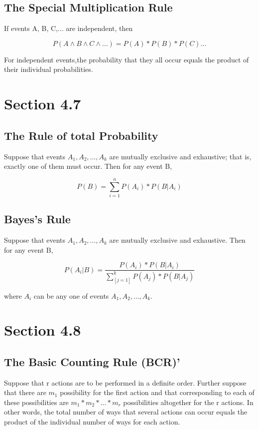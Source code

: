 \documentclass[12pt]{article}
\begin{document}
        \subsection*{The Special Multiplication Rule}
            If events A, B, C,$\dots$ are independent, then
            \begin{center}
                \[
                    P(A \wedge B \wedge C \wedge \dots) = P(A) * P(B) * P(C) \dots     
                \]
            \end{center}
            For independent events,the probability that they all occur equals the product of their 
            individual probabilities.
    \section*{Section 4.7}
        \subsection*{The Rule of total Probability}
        Suppose that events $A_1, A_2,\dots, A_k$ are mutually exclusive and exhaustive; that is, 
        exactly one of them must occur. Then for any event B,
        \begin{center}
            \[
                P(B) = \sum_{i=1}^n P(A_i) * P(B|A_i)
            \]
        \end{center}
        \subsection*{Bayes's Rule}
            Suppose that events $A_1, A_2,..., A_k$ are mutually exclusive and exhaustive. Then for 
            any event B,
            \begin{center}
                \[
                    P(A_i|B) = \frac{P(A_i) * P(B|A_i)}{\sum_[j=1]^k P(A_j) * P(B|A_j)}    
                \]
            \end{center}
            where $A_i$ can be any one of events $A_1, A_2,\dots, A_k$.
    \section*{Section 4.8}
        \subsection*{The Basic Counting Rule (BCR)'}
            Suppose that r actions are to be performed in a definite order. Further suppose that
            there are $m_1$ possibility for the first action and that corresponding to each of
            these possibilities are $m_1 * m_2 * \dots * m_r$ possibilities altogether for the r
            actions. In other words, the total
            number of ways that several actions can occur equals the product of the individual 
            number of ways for each action.
\end{document}
